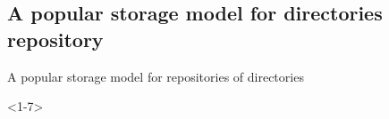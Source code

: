 \documentclass[ignorenonframetext,red]{beamer}
\begin{document}
\subsection{A popular storage model for directories repository}

\begin{frame}{A popular storage model for repositories of directories}
  \begin{onlyenv}<1-7>
    \begin{center}

\end{center}
\end{onlyenv}
\end{frame}
\end{document}
